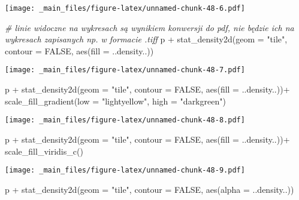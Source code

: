 \documentclass[
]{book}
\newenvironment{Shaded}{\begin{snugshade}}{\end{snugshade}}
\newcommand{\AttributeTok}[1]{\textcolor[rgb]{0.77,0.63,0.00}{#1}}
\newcommand{\CommentTok}[1]{\textcolor[rgb]{0.56,0.35,0.01}{\textit{#1}}}
\newcommand{\ConstantTok}[1]{\textcolor[rgb]{0.00,0.00,0.00}{#1}}
\newcommand{\FunctionTok}[1]{\textcolor[rgb]{0.00,0.00,0.00}{#1}}
\newcommand{\NormalTok}[1]{#1}
\newcommand{\SpecialCharTok}[1]{\textcolor[rgb]{0.00,0.00,0.00}{#1}}
\newcommand{\StringTok}[1]{\textcolor[rgb]{0.31,0.60,0.02}{#1}}
\begin{document}
\texttt{[image: \_main\_files/figure-latex/unnamed-chunk-48-6.pdf]}

\begin{Shaded}
\begin{Highlighting}[]
\CommentTok{\# linie widoczne na wykresach są wynikiem konwersji do pdf, nie będzie ich na wykresach zapisanych np. w formacie .tiff}
\NormalTok{p }\SpecialCharTok{+} \FunctionTok{stat\_density2d}\NormalTok{(}\AttributeTok{geom =} \StringTok{"tile"}\NormalTok{, }\AttributeTok{contour  =}  \ConstantTok{FALSE}\NormalTok{, }\FunctionTok{aes}\NormalTok{(}\AttributeTok{fill  =}\NormalTok{  ..density..))}
\end{Highlighting}
\end{Shaded}

\texttt{[image: \_main\_files/figure-latex/unnamed-chunk-48-7.pdf]}

\begin{Shaded}
\begin{Highlighting}[]
\NormalTok{p }\SpecialCharTok{+} \FunctionTok{stat\_density2d}\NormalTok{(}\AttributeTok{geom =} \StringTok{"tile"}\NormalTok{, }\AttributeTok{contour  =}  \ConstantTok{FALSE}\NormalTok{, }\FunctionTok{aes}\NormalTok{(}\AttributeTok{fill  =}\NormalTok{  ..density..))}\SpecialCharTok{+}
  \FunctionTok{scale\_fill\_gradient}\NormalTok{(}\AttributeTok{low  =}  \StringTok{"lightyellow"}\NormalTok{, }\AttributeTok{high  =}  \StringTok{"darkgreen"}\NormalTok{)}
\end{Highlighting}
\end{Shaded}

\texttt{[image: \_main\_files/figure-latex/unnamed-chunk-48-8.pdf]}

\begin{Shaded}
\begin{Highlighting}[]
\NormalTok{p }\SpecialCharTok{+} \FunctionTok{stat\_density2d}\NormalTok{(}\AttributeTok{geom =} \StringTok{"tile"}\NormalTok{, }\AttributeTok{contour  =}  \ConstantTok{FALSE}\NormalTok{, }\FunctionTok{aes}\NormalTok{(}\AttributeTok{fill  =}\NormalTok{  ..density..))}\SpecialCharTok{+}
  \FunctionTok{scale\_fill\_viridis\_c}\NormalTok{()}
\end{Highlighting}
\end{Shaded}

\texttt{[image: \_main\_files/figure-latex/unnamed-chunk-48-9.pdf]}

\begin{Shaded}
\begin{Highlighting}[]
\NormalTok{p }\SpecialCharTok{+} \FunctionTok{stat\_density2d}\NormalTok{(}\AttributeTok{geom =} \StringTok{"tile"}\NormalTok{, }\AttributeTok{contour  =}  \ConstantTok{FALSE}\NormalTok{, }\FunctionTok{aes}\NormalTok{(}\AttributeTok{alpha  =}\NormalTok{  ..density..))}
\end{Highlighting}
\end{Shaded}
\end{document}
